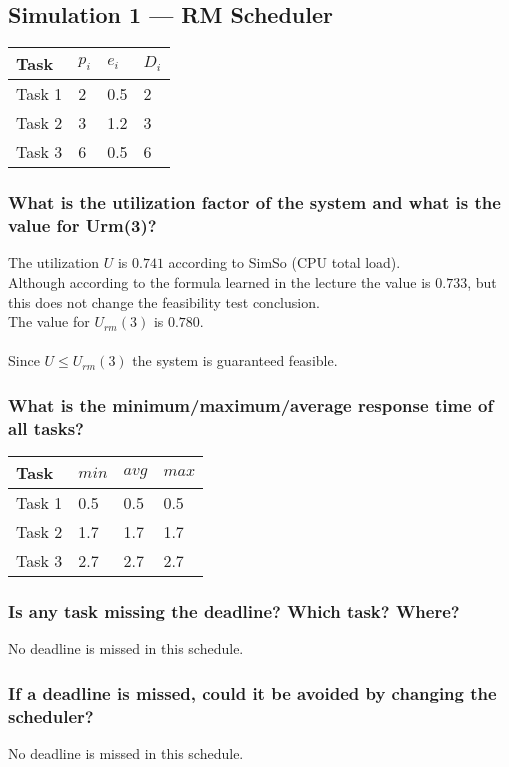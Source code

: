 \documentclass{article}
\begin{document}
\subsection{Simulation 1 --- RM Scheduler}

\begin{tabular}{|l||l|l|l|}
\hline
Task   & $p_i$ & $e_i$ & $D_i$ \\
\hline
\hline
Task 1 & 2 & 0.5 & 2 \\
\hline
Task 2 & 3 & 1.2 & 3 \\
\hline
Task 3 & 6 & 0.5 & 6 \\
\hline
\end{tabular}

\subsubsection{What is the utilization factor of the system and what is the value for Urm(3)?}
The utilization $U$ is $0.741$ according to SimSo (CPU total load). \\
Although according to the formula learned in the lecture the value is $0.733$,
but this does not change the feasibility test conclusion. \\
The value for $U_{rm}(3)$ is $0.780$. \\
\\
Since $U \leq U_{rm}(3)$ the system is guaranteed feasible.

\subsubsection{What is the minimum/maximum/average response time of all tasks?}

\begin{tabular}{|l||l|l|l|}
\hline
Task   & $min$ & $avg$ & $max$ \\
\hline
\hline
Task 1 & 0.5 & 0.5 & 0.5 \\
\hline
Task 2 & 1.7 & 1.7 & 1.7 \\
\hline
Task 3 & 2.7 & 2.7 & 2.7 \\
\hline
\end{tabular}

\subsubsection{Is any task missing the deadline? Which task? Where?}
No deadline is missed in this schedule.

\subsubsection{If a deadline is missed, could it be avoided by changing the scheduler?}
No deadline is missed in this schedule.
\end{document}
